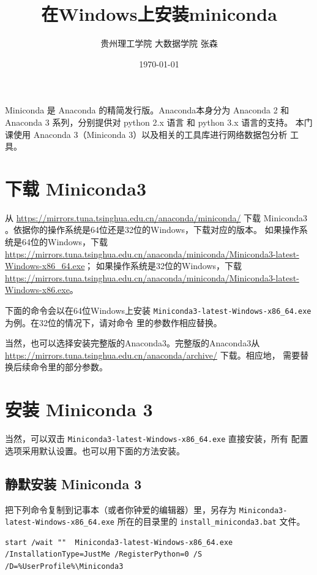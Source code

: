 \documentclass[12pt,a4paper]{article}
\author{贵州理工学院 大数据学院 张森}
\date{\today}
\title{在Windows上安装miniconda}
\begin{document}
\maketitle
\tableofcontents

Miniconda 是 Anaconda 的精简发行版。Anaconda本身分为 Anaconda 2 和
Anaconda 3 系列，分别提供对 python 2.x 语言 和 python 3.x 语言的支持。
本门课使用 Anaconda 3（Miniconda 3）以及相关的工具库进行网络数据包分析
工具。

\section{下载 Miniconda3}
\label{sec:org9b7b77f}

从 \url{https://mirrors.tuna.tsinghua.edu.cn/anaconda/miniconda/} 下载
Miniconda3 。依据你的操作系统是64位还是32位的Windows，下载对应的版本。
如果操作系统是64位的Windows，下载
\url{https://mirrors.tuna.tsinghua.edu.cn/anaconda/miniconda/Miniconda3-latest-Windows-x86\_64.exe}；
如果操作系统是32位的Windows，下载
\url{https://mirrors.tuna.tsinghua.edu.cn/anaconda/miniconda/Miniconda3-latest-Windows-x86.exe}。

下面的命令会以在64位Windows上安装
\texttt{Miniconda3-latest-Windows-x86\_64.exe} 为例。在32位的情况下，请对命令
里的参数作相应替换。

当然，也可以选择安装完整版的Anaconda3。完整版的Anaconda3从
\url{https://mirrors.tuna.tsinghua.edu.cn/anaconda/archive/} 下载。相应地，
需要替换后续命令里的部分参数。

\section{安装 Miniconda 3}
\label{sec:orgb61dbbd}

当然，可以双击 \texttt{Miniconda3-latest-Windows-x86\_64.exe} 直接安装，所有
配置选项采用默认设置。也可以用下面的方法安装。

\subsection{静默安装  Miniconda 3}
\label{sec:org51065c6}

把下列命令复制到记事本（或者你钟爱的编辑器）里，另存为
\texttt{Miniconda3-latest-Windows-x86\_64.exe} 所在的目录里的
\texttt{install\_miniconda3.bat} 文件。

\begin{verbatim}
start /wait ""  Miniconda3-latest-Windows-x86_64.exe /InstallationType=JustMe /RegisterPython=0 /S /D=%UserProfile%\Miniconda3
\end{verbatim}
\end{document}
